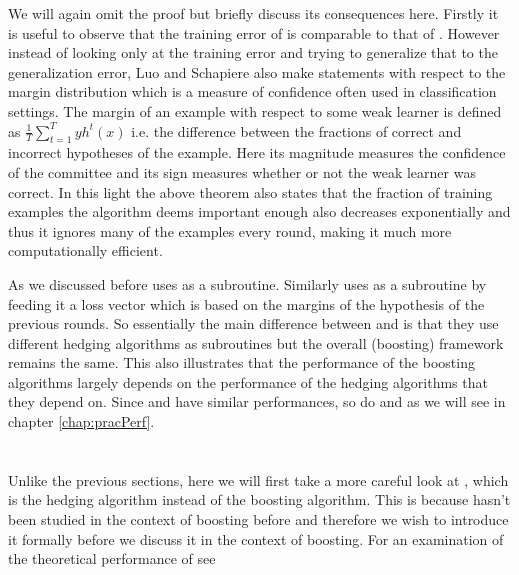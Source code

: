  We will again omit the proof but briefly discuss its consequences here. Firstly it is useful to observe that the training error of \NHB is comparable to that of \adaB. However instead of looking only at the training error and trying to generalize that to the generalization error, Luo and Schapiere also make statements with respect to the margin distribution which is a measure of confidence often used in classification settings. The margin of an example with respect to some weak learner is defined as $\frac1T \sum^T_{t=1}yh^t(x)$ i.e. the difference between the fractions of correct and incorrect hypotheses of the example. Here its magnitude measures the confidence of the committee and its sign measures whether or not the weak learner was correct. In this light the above theorem also states that the fraction of training examples the algorithm deems important enough also decreases exponentially and thus it ignores many of the examples every round, making it much more computationally efficient.

 \par As we discussed before \adaB uses \hedge as a subroutine. Similarly \NHB uses \adaN as a subroutine by feeding it a loss vector which is based on the margins of the hypothesis of the previous rounds. So essentially the main difference between \NHB and \adaB is that they use different hedging algorithms as subroutines but the overall (boosting) framework remains the same. This also illustrates that the performance of the boosting algorithms largely depends on the performance of the hedging algorithms that they depend on. Since \hedge and \adaN have similar performances, so do \adaB and \NHB as we will see in chapter \ref{chap:pracPerf}.


\section{\squintB}
\label{sec:squintB}
Unlike the previous sections, here we will first take a more careful look at \squint, which is the hedging algorithm instead of the boosting algorithm. This is because \squint hasn't been studied in the context of boosting before and therefore we wish to introduce it formally before we discuss it in the context of boosting. For an examination of the theoretical performance of \squintB see \cite{Otten2016}

